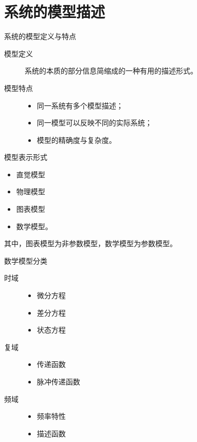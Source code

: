\section{系统的模型描述}
\begin{frame}{系统的模型定义与特点}
\begin{description}
\item[模型定义]
    系统的本质的部分信息简缩成的一种有用的描述形式。
\item[模型特点]
\begin{itemize}
\item 同一系统有多个模型描述； 
\item 同一模型可以反映不同的实际系统；
\item 模型的精确度与复杂度。
\end{itemize}
\end{description}
\end{frame}

\begin{frame}{模型表示形式}
\begin{itemize}
\item 直觉模型
\item 物理模型
\item 图表模型
\item 数学模型。
\end{itemize}
其中，图表模型为非参数模型，数学模型为参数模型。
\end{frame}





\begin{frame}{数学模型分类}
\begin{description}
\item[时域]
\begin{itemize}
\item 微分方程
\item 差分方程
\item 状态方程
\end{itemize}
\item[复域]
\begin{itemize}
\item 传递函数
\item 脉冲传递函数
\end{itemize}
\item[频域]
\begin{itemize}
\item 频率特性
\item 描述函数
\end{itemize}
\end{description}
\end{frame}



